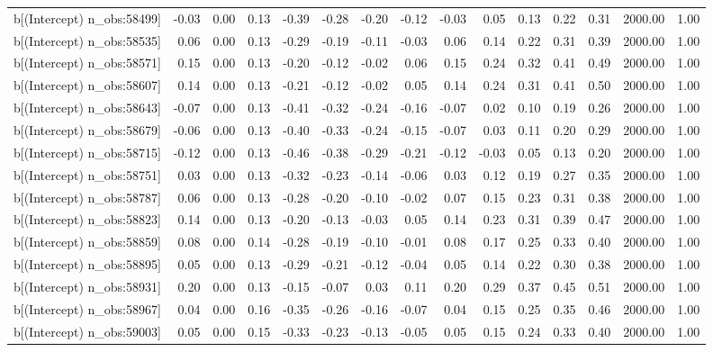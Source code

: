 \begin{table}[ht]
\begin{tabular}{rrrrrrrrrrrrrrr}
  b[(Intercept) n\_obs:58499] & -0.03 & 0.00 & 0.13 & -0.39 & -0.28 & -0.20 & -0.12 & -0.03 & 0.05 & 0.13 & 0.22 & 0.31 & 2000.00 & 1.00 \\ 
  b[(Intercept) n\_obs:58535] & 0.06 & 0.00 & 0.13 & -0.29 & -0.19 & -0.11 & -0.03 & 0.06 & 0.14 & 0.22 & 0.31 & 0.39 & 2000.00 & 1.00 \\ 
  b[(Intercept) n\_obs:58571] & 0.15 & 0.00 & 0.13 & -0.20 & -0.12 & -0.02 & 0.06 & 0.15 & 0.24 & 0.32 & 0.41 & 0.49 & 2000.00 & 1.00 \\ 
  b[(Intercept) n\_obs:58607] & 0.14 & 0.00 & 0.13 & -0.21 & -0.12 & -0.02 & 0.05 & 0.14 & 0.24 & 0.31 & 0.41 & 0.50 & 2000.00 & 1.00 \\ 
  b[(Intercept) n\_obs:58643] & -0.07 & 0.00 & 0.13 & -0.41 & -0.32 & -0.24 & -0.16 & -0.07 & 0.02 & 0.10 & 0.19 & 0.26 & 2000.00 & 1.00 \\ 
  b[(Intercept) n\_obs:58679] & -0.06 & 0.00 & 0.13 & -0.40 & -0.33 & -0.24 & -0.15 & -0.07 & 0.03 & 0.11 & 0.20 & 0.29 & 2000.00 & 1.00 \\ 
  b[(Intercept) n\_obs:58715] & -0.12 & 0.00 & 0.13 & -0.46 & -0.38 & -0.29 & -0.21 & -0.12 & -0.03 & 0.05 & 0.13 & 0.20 & 2000.00 & 1.00 \\ 
  b[(Intercept) n\_obs:58751] & 0.03 & 0.00 & 0.13 & -0.32 & -0.23 & -0.14 & -0.06 & 0.03 & 0.12 & 0.19 & 0.27 & 0.35 & 2000.00 & 1.00 \\ 
  b[(Intercept) n\_obs:58787] & 0.06 & 0.00 & 0.13 & -0.28 & -0.20 & -0.10 & -0.02 & 0.07 & 0.15 & 0.23 & 0.31 & 0.38 & 2000.00 & 1.00 \\ 
  b[(Intercept) n\_obs:58823] & 0.14 & 0.00 & 0.13 & -0.20 & -0.13 & -0.03 & 0.05 & 0.14 & 0.23 & 0.31 & 0.39 & 0.47 & 2000.00 & 1.00 \\ 
  b[(Intercept) n\_obs:58859] & 0.08 & 0.00 & 0.14 & -0.28 & -0.19 & -0.10 & -0.01 & 0.08 & 0.17 & 0.25 & 0.33 & 0.40 & 2000.00 & 1.00 \\ 
  b[(Intercept) n\_obs:58895] & 0.05 & 0.00 & 0.13 & -0.29 & -0.21 & -0.12 & -0.04 & 0.05 & 0.14 & 0.22 & 0.30 & 0.38 & 2000.00 & 1.00 \\ 
  b[(Intercept) n\_obs:58931] & 0.20 & 0.00 & 0.13 & -0.15 & -0.07 & 0.03 & 0.11 & 0.20 & 0.29 & 0.37 & 0.45 & 0.51 & 2000.00 & 1.00 \\ 
  b[(Intercept) n\_obs:58967] & 0.04 & 0.00 & 0.16 & -0.35 & -0.26 & -0.16 & -0.07 & 0.04 & 0.15 & 0.25 & 0.35 & 0.46 & 2000.00 & 1.00 \\ 
  b[(Intercept) n\_obs:59003] & 0.05 & 0.00 & 0.15 & -0.33 & -0.23 & -0.13 & -0.05 & 0.05 & 0.15 & 0.24 & 0.33 & 0.40 & 2000.00 & 1.00 \\ 

\end{tabular}
\end{table}
